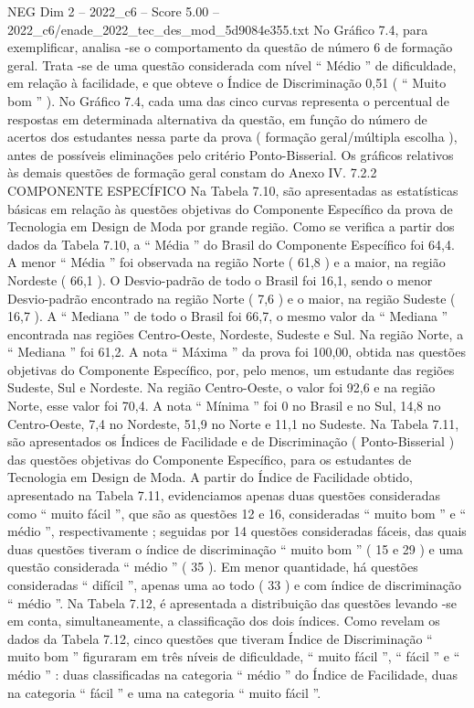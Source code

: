 \begin{textsample}{NEG Dim 2 – 2022\_c6 – Score 5.00 – 2022\_c6/enade\_2022\_tec\_des\_mod\_5d9084e355.txt}
No Gráfico 7.4, para exemplificar, analisa -se o comportamento da questão de número 6 de formação geral.
Trata -se de uma questão considerada com nível “ Médio ” de dificuldade, em relação à facilidade, e que obteve o Índice de Discriminação 0,51 ( “ Muito bom ” ).
No Gráfico 7.4, cada uma das cinco curvas representa o percentual de respostas em determinada alternativa da questão, em função do número de acertos dos estudantes nessa parte da prova ( formação geral/múltipla escolha ), antes de possíveis eliminações pelo critério Ponto-Bisserial.
Os gráficos relativos às demais questões de formação geral constam do Anexo IV. 7.2.2 COMPONENTE ESPECÍFICO Na Tabela 7.10, são apresentadas as estatísticas básicas em relação às questões objetivas do Componente Específico da prova de Tecnologia em Design de Moda por grande região.
Como se verifica a partir dos dados da Tabela 7.10, a “ Média ” do Brasil do Componente Específico foi 64,4.
A menor “ Média ” foi observada na região Norte ( 61,8 ) e a maior, na região Nordeste ( 66,1 ).
O Desvio-padrão de todo o Brasil foi 16,1, sendo o menor Desvio-padrão encontrado na região Norte ( 7,6 ) e o maior, na região Sudeste ( 16,7 ).
A “ Mediana ” de todo o Brasil foi 66,7, o mesmo valor da “ Mediana ” encontrada nas regiões Centro-Oeste, Nordeste, Sudeste e Sul.
Na região Norte, a “ Mediana ” foi 61,2.
A nota “ Máxima ” da prova foi 100,00, obtida nas questões objetivas do Componente Específico, por, pelo menos, um estudante das regiões Sudeste, Sul e Nordeste.
Na região Centro-Oeste, o valor foi 92,6 e na região Norte, esse valor foi 70,4.
A nota “ Mínima ” foi 0 no Brasil e no Sul, 14,8 no Centro-Oeste, 7,4 no Nordeste, 51,9 no Norte e 11,1 no Sudeste.
Na Tabela 7.11, são apresentados os Índices de Facilidade e de Discriminação ( Ponto-Bisserial ) das questões objetivas do Componente Específico, para os estudantes de Tecnologia em Design de Moda.
A partir do Índice de Facilidade obtido, apresentado na Tabela 7.11, evidenciamos apenas duas questões consideradas como “ muito fácil ”, que são as questões 12 e 16, consideradas “ muito bom ” e “ médio ”, respectivamente ; seguidas por 14 questões consideradas fáceis, das quais duas questões tiveram o índice de discriminação “ muito bom ” ( 15 e 29 ) e uma questão considerada “ médio ” ( 35 ).
Em menor quantidade, há questões consideradas “ difícil ”, apenas uma ao todo ( 33 ) e com índice de discriminação “ médio ”.
Na Tabela 7.12, é apresentada a distribuição das questões levando -se em conta, simultaneamente, a classificação dos dois índices.
Como revelam os dados da Tabela 7.12, cinco questões que tiveram Índice de Discriminação “ muito bom ” figuraram em três níveis de dificuldade, “ muito fácil ”, “ fácil ” e “ médio ” : duas classificadas na categoria “ médio ” do Índice de Facilidade, duas na categoria “ fácil ” e uma na categoria “ muito fácil ”.

\end{textsample}
